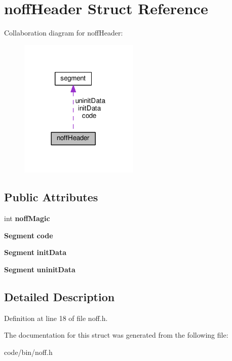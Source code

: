 \section{noff\+Header Struct Reference}
\label{structnoff_header}


Collaboration diagram for noff\+Header\+:\nopagebreak
\begin{figure}[H]
\begin{center}
\leavevmode
\includegraphics[width=161pt]{structnoff_header__coll__graph}
\end{center}
\end{figure}
\subsection*{Public Attributes}
\begin{DoxyCompactItemize}
\item 
int {\bfseries noff\+Magic}\label{structnoff_header_a121a20eb53069f59b0bb03a5e4b9fa73}

\item 
{\bf Segment} {\bfseries code}\label{structnoff_header_ab8701e16959da7502011c2a6cdafbb01}

\item 
{\bf Segment} {\bfseries init\+Data}\label{structnoff_header_a6375fd4b1c40f4fb5f0874e97ad6f5a0}

\item 
{\bf Segment} {\bfseries uninit\+Data}\label{structnoff_header_a8269329d2dcde604db572e08a63ec1b2}

\end{DoxyCompactItemize}


\subsection{Detailed Description}


Definition at line 18 of file noff.\+h.



The documentation for this struct was generated from the following file\+:\begin{DoxyCompactItemize}
\item 
code/bin/noff.\+h\end{DoxyCompactItemize}
